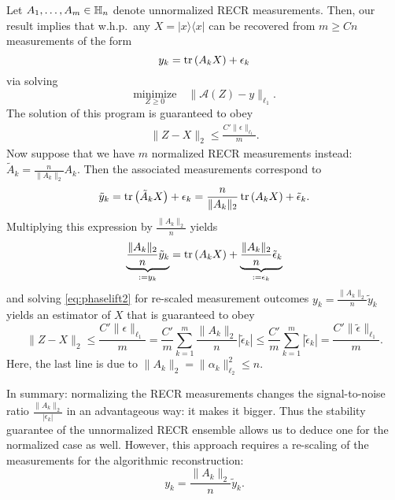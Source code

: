 Let $A_1,\ldots,A_m \in \mathbb{H}_n$ denote unnormalized RECR measurements.
Then, our result implies that w.h.p.\ any $X = | x \rangle \!\langle  x|$ can be recovered from $m \geq  C n$ measurements of the form
\begin{equation*}
  y_k = \operatorname{tr} \left( A_k X \right) + \epsilon_k
\end{equation*}
via solving
\[
  \underset{Z\geq 0}{\textrm{minimize}} \quad \| \mathcal{A}(Z) -  y \|_{\ell_1}. \label{eq:phaselift2}
\]
The solution of this program is guaranteed to obey
\begin{align*}
\| Z - X \|_2 \leq \frac{C' \| \epsilon \|_{\ell_1}}{m}.
\end{align*}
Now suppose that we have $m$ normalized RECR measurements instead: $\tilde{A}_k = \frac{n}{\| A_k \|_{2}} A_k$. Then the associated measurements correspond to
\begin{equation*}
  \tilde{y}_k = \operatorname{tr} \left( \tilde{A}_k X \right) + \epsilon_k = \frac{ n}{\| A_k \|_2} \operatorname{tr} \left( A_k X \right) + \tilde{\epsilon}_k.
\end{equation*}
Multiplying this expression by $\frac{\| A_k \|_2}{n}$ yields
\begin{equation*}
\underset{:= y_k}{\underbrace{ \frac{ \| A_k \|_2}{n}\tilde{y}_k}}
= \operatorname{tr} \left( A_k X \right) + \underset{:= \epsilon_k}{\underbrace{ \frac{ \| A_k \|_2}{n}\tilde{\epsilon}_k}}
\end{equation*}
and solving \eqref{eq:phaselift2} for re-scaled measurement outcomes $y_k = \frac{ \| A_k \|_2}{n}\tilde{y}_k$ yields an estimator of $X$ that is guaranteed to obey
\begin{equation*}
  \| Z - X \|_2 \leq \frac{C' \|  \epsilon \|_{\ell_1}}{m}
  = \frac{C'}{m} \sum_{k=1}^m \frac{ \| A_k \|_2}{n} | \tilde{\epsilon}_k |
  \leq \frac{C'}{m} \sum_{k=1}^m | \tilde{\epsilon}_k| = \frac{C' \| \tilde{\epsilon} \|_{\ell_1}}{m}.
\end{equation*}
Here, the last line is due to $\| A_k \|_2 = \| \alpha_k \|_{\ell_2}^2 \leq n$.

In summary: normalizing the RECR measurements changes the signal-to-noise ratio $\frac{ \| A_k \|_2}{| \epsilon_k|}$ in an advantageous way: it makes it bigger. Thus the stability guarantee of the unnormalized RECR ensemble allows us to deduce one for the normalized case as well. However, this approach requires a re-scaling of the measurements for the algorithmic reconstruction:
\begin{equation*}
  y_k = \frac{ \| A_k \|_2}{n} \tilde{y}_k.
\end{equation*}




